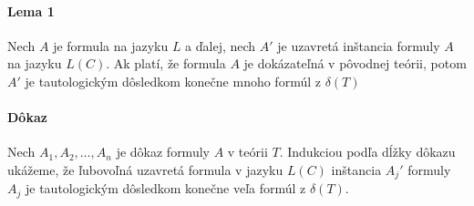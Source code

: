 \paragraph{Lema 1} Nech $A$ je formula na jazyku $L$ a ďalej, nech $A'$ je
uzavretá inštancia formuly $A$ na jazyku $L(C)$. Ak platí, že formula $A$ je
dokázateľná v pôvodnej teórii, potom $A'$ je tautologickým dôsledkom konečne
mnoho formúl z $\delta(T)$

\paragraph{Dôkaz} Nech $A_1, A_2, \ldots, A_n$ je dôkaz formuly $A$ v teórii
$T$. Indukciou podľa dĺžky dôkazu ukážeme, že ľubovoľná uzavretá formula v
jazyku $L(C)$ inštancia $A_j'$ formuly $A_j$ je tautologickým dôsledkom konečne
veľa formúl z $\delta(T)$.

